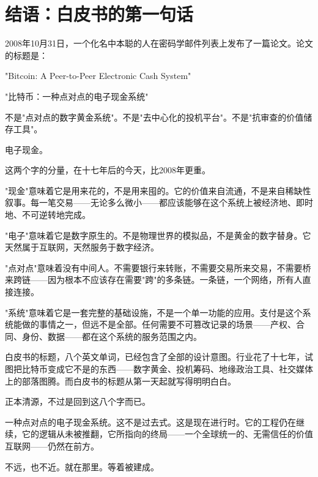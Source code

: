 \documentclass[a4paper,12pt,openany]{ctexbook}
\begin{document}
\section*{结语：白皮书的第一句话}


2008年10月31日，一个化名中本聪的人在密码学邮件列表上发布了一篇论文。论文的标题是：

"Bitcoin: A Peer-to-Peer Electronic Cash System"

"比特币：一种点对点的电子现金系统"

不是"点对点的数字黄金系统"。不是"去中心化的投机平台"。不是"抗审查的价值储存工具"。

电子现金。

这两个字的分量，在十七年后的今天，比2008年更重。

"现金"意味着它是用来花的，不是用来囤的。它的价值来自流通，不是来自稀缺性叙事。每一笔交易——无论多么微小——都应该能够在这个系统上被经济地、即时地、不可逆转地完成。

"电子"意味着它是数字原生的。不是物理世界的模拟品，不是黄金的数字替身。它天然属于互联网，天然服务于数字经济。

"点对点"意味着没有中间人。不需要银行来转账，不需要交易所来交易，不需要桥来跨链——因为根本不应该存在需要"跨"的多条链。一条链，一个网络，所有人直接连接。

"系统"意味着它是一套完整的基础设施，不是一个单一功能的应用。支付是这个系统能做的事情之一，但远不是全部。任何需要不可篡改记录的场景——产权、合同、身份、数据——都在这个系统的服务范围之内。

白皮书的标题，八个英文单词，已经包含了全部的设计意图。行业花了十七年，试图把比特币变成它不是的东西——数字黄金、投机筹码、地缘政治工具、社交媒体上的部落图腾。而白皮书的标题从第一天起就写得明明白白。

正本清源，不过是回到这八个字而已。

一种点对点的电子现金系统。这不是过去式。这是现在进行时。它的工程仍在继续，它的逻辑从未被推翻，它所指向的终局——一个全球统一的、无需信任的价值互联网——仍然在前方。

不远，也不近。就在那里。等着被建成。
\end{document}
